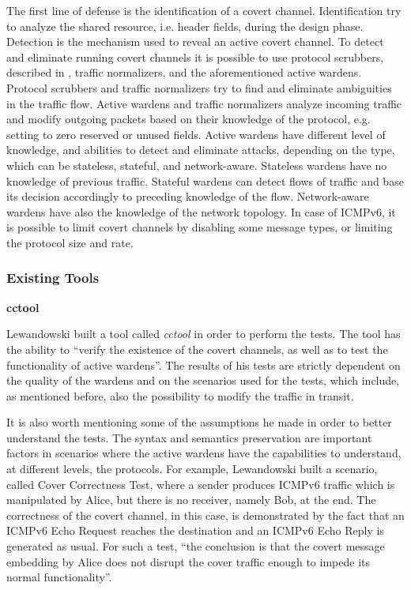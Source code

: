 \documentclass[12pt]{article}
\begin{document}
The first line of defense is the identification of a covert channel. Identification try to analyze the shared resource, i.e. header fields, during the design phase. Detection is the mechanism used to reveal an active covert channel. To detect and eliminate running covert channels it is possible to use protocol scrubbers, described in \cite{protocolScrubbers}, traffic normalizers, and the aforementioned active wardens. Protocol scrubbers and traffic normalizers try to find and eliminate ambiguities in the traffic flow. Active wardens and traffic normalizers analyze incoming traffic and modify outgoing packets based on their knowledge of the protocol, e.g. setting to zero reserved or unused fields. Active wardens have different level of knowledge, and abilities to detect and eliminate attacks, depending on the type, which can be stateless, stateful, and network-aware. Stateless wardens have no knowledge of previous traffic. Stateful wardens can detect flows of traffic and base its decision accordingly to preceding knowledge of the flow. Network-aware wardens have also the knowledge of the network topology. In case of ICMPv6, it is possible to limit covert channels by disabling some message types, or limiting the protocol size and rate\cite{milevaPanajotov}.

\subsubsection{Existing Tools}
\label{subsub:tools}

\textbf{cctool}

Lewandowski built a tool called \textit{cctool} in order to perform the tests. The tool has the ability to ``verify the existence of the covert channels, as well as to test the functionality of active wardens''. The results of his tests are strictly dependent on the quality of the wardens and on the scenarios used for the tests, which include, as mentioned before, also the possibility to modify the traffic in transit\cite{lewandowski}.

It is also worth mentioning some of the assumptions he made in order to better understand the tests. The syntax and semantics preservation are important factors in scenarios where the active wardens have the capabilities to understand, at different levels, the protocols. For example, Lewandowski built a scenario, called Cover Correctness Test, where a sender produces ICMPv6 traffic which is manipulated by Alice, but there is no receiver, namely Bob, at the end. The correctness of the covert channel, in this case, is demonstrated by the fact that an ICMPv6 Echo Request reaches the destination and an ICMPv6 Echo Reply is generated as usual. For such a test, ``the conclusion is that the covert message embedding by Alice does not disrupt the cover traffic enough to impede its normal functionality''\cite{lewandowski}.
\end{document}
